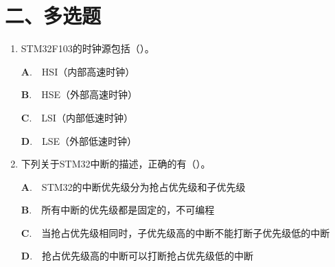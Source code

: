 ﻿\documentclass{ctexart}
\numberwithin{figure}{section}
\numberwithin{equation}{section}
\newcommand{\choice}[2]{\par\noindent\hspace{3em}\textbf{#1}.~~#2}
\begin{document}
\section*{二、多选题}

\begin{enumerate}
\item STM32F103的时钟源包括（\quad）。
\choice{A}{HSI（内部高速时钟）}
\choice{B}{HSE（外部高速时钟）}
\choice{C}{LSI（内部低速时钟）}
\choice{D}{LSE（外部低速时钟）}
\item 下列关于STM32中断的描述，正确的有（\quad）。
\choice{A}{STM32的中断优先级分为抢占优先级和子优先级}
\choice{B}{所有中断的优先级都是固定的，不可编程}
\choice{C}{当抢占优先级相同时，子优先级高的中断不能打断子优先级低的中断}
\choice{D}{抢占优先级高的中断可以打断抢占优先级低的中断}
\end{enumerate}
\end{document}
